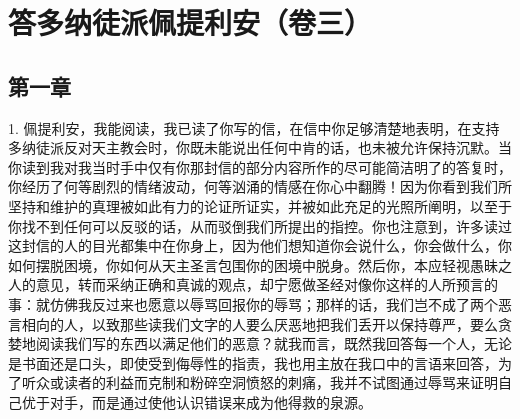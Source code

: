 

\section{答多纳徒派佩提利安（卷三）}

\par


\subsection{第一章}

1. 佩提利安，我能阅读，我已读了你写的信，在信中你足够清楚地表明，在支持多纳徒派反对天主教会时，你既未能说出任何中肯的话，也未被允许保持沉默。当你读到我对我当时手中仅有你那封信的部分内容所作的尽可能简洁明了的答复时，你经历了何等剧烈的情绪波动，何等汹涌的情感在你心中翻腾！因为你看到我们所坚持和维护的真理被如此有力的论证所证实，并被如此充足的光照所阐明，以至于你找不到任何可以反驳的话，从而驳倒我们所提出的指控。你也注意到，许多读过这封信的人的目光都集中在你身上，因为他们想知道你会说什么，你会做什么，你如何摆脱困境，你如何从天主圣言包围你的困境中脱身。然后你，本应轻视愚昧之人的意见，转而采纳正确和真诚的观点，却宁愿做圣经对像你这样的人所预言的事：就仿佛我反过来也愿意以辱骂回报你的辱骂；那样的话，我们岂不成了两个恶言相向的人，以致那些读我们文字的人要么厌恶地把我们丢开以保持尊严，要么贪婪地阅读我们写的东西以满足他们的恶意？就我而言，既然我回答每一个人，无论是书面还是口头，即使受到侮辱性的指责，我也用主放在我口中的言语来回答，为了听众或读者的利益而克制和粉碎空洞愤怒的刺痛，我并不试图通过辱骂来证明自己优于对手，而是通过使他认识错误来成为他得救的泉源。\par

